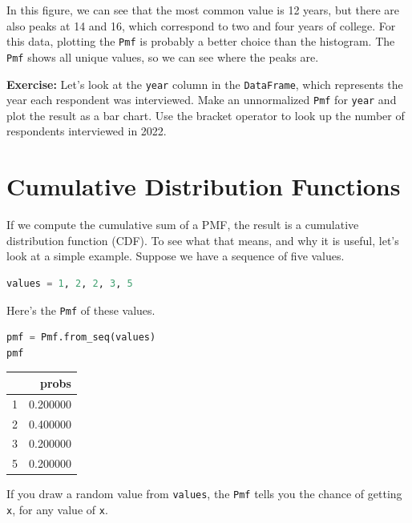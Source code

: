 In this figure, we can see that the most common value is 12 years, but
there are also peaks at 14 and 16, which correspond to two and four
years of college. For this data, plotting the
\passthrough{\lstinline!Pmf!} is probably a better choice than the
histogram. The \passthrough{\lstinline!Pmf!} shows all unique values, so
we can see where the peaks are.

\textbf{Exercise:} Let's look at the \passthrough{\lstinline!year!}
column in the \passthrough{\lstinline!DataFrame!}, which represents the
year each respondent was interviewed. Make an unnormalized
\passthrough{\lstinline!Pmf!} for \passthrough{\lstinline!year!} and
plot the result as a bar chart. Use the bracket operator to look up the
number of respondents interviewed in 2022.

\section{Cumulative Distribution
Functions}\label{cumulative-distribution-functions}

If we compute the cumulative sum of a PMF, the result is a cumulative
distribution function (CDF). To see what that means, and why it is
useful, let's look at a simple example. Suppose we have a sequence of
five values.

\begin{lstlisting}[language=Python,style=source]
values = 1, 2, 2, 3, 5  
\end{lstlisting}

Here's the \passthrough{\lstinline!Pmf!} of these values.

\begin{lstlisting}[language=Python,style=source]
pmf = Pmf.from_seq(values)
pmf
\end{lstlisting}

\begin{tabular}{lr}
\midrule
 & probs \\
\midrule
1 & 0.200000 \\
2 & 0.400000 \\
3 & 0.200000 \\
5 & 0.200000 \\
\midrule
\end{tabular}

If you draw a random value from \passthrough{\lstinline!values!}, the
\passthrough{\lstinline!Pmf!} tells you the chance of getting
\passthrough{\lstinline!x!}, for any value of
\passthrough{\lstinline!x!}.


